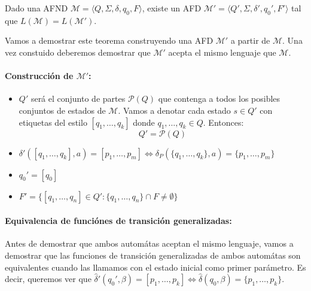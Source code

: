 \begin{teorema}
  Dado una AFND \(\mathcal{M} = \langle Q, \Sigma, \delta, q_0, F\rangle\), existe un AFD \(\mathcal{M}' = \langle Q', \Sigma, \delta', q_0', F'\rangle\) tal que \(L(\mathcal{M}) = L(\mathcal{M}')\).
\end{teorema}
Vamos a demostrar este teorema construyendo una AFD \(\mathcal{M}'\) a partir de \(\mathcal{M}\). Una vez constuido deberemos demostrar que \(\mathcal{M}'\) acepta el mismo lenguaje que \(\mathcal{M}\).

\paragraph{Construcción de \(\mathcal{M}'\):}
\begin{itemize}
  \item \(Q'\) será el conjunto de partes \(\mathcal{P}(Q)\) que contenga a todos los posibles conjuntos de estados de \(\mathcal{M}\). Vamos a denotar cada estado \(s\in Q'\) con etiquetas del estilo \([q_1,\dots, q_k]\) donde \(q_1,\dots,q_k\in Q\). Entonces:
        \[ Q' = \mathcal{P}(Q)\]
  \item \(\delta'([q_1,\dots, q_k],a) = [p_1, \dots, p_m] \iff \delta_P(\{q_1,\dots,q_k\},a) = \{p_1,\dots,p_m\}\)
  \item \(q_0' = [q_0]\)
  \item \(F' = \{ [q_1,\dots, q_n]\in Q' : \{q_1,\dots,q_n\}\cap F \neq \emptyset\}\)
\end{itemize}

\paragraph{Equivalencia de funciónes de transición generalizadas:} Antes de demostrar que ambos automátas aceptan el mismo lenguaje, vamos a demostrar que las funciones de transición generalizadas de ambos automátas son equivalentes cuando las llamamos con el estado inicial como primer parámetro. Es decir, queremos ver que \(\hat{\delta}'(q_0',\beta) = [p_1,\dots,p_k] \iff \hat{\delta}(q_0,\beta) = \{p_1,\dots, p_k\}\).

